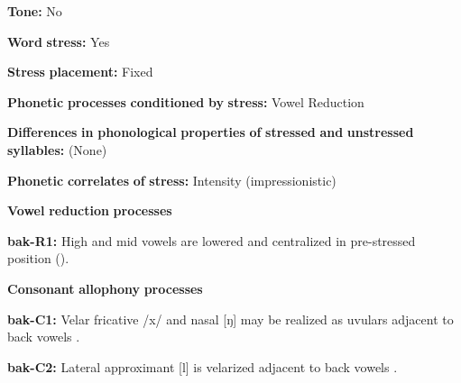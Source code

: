 \begin{styleBody}
\textbf{Tone:} No
\end{styleBody}

\begin{styleBody}
\textbf{Word} \textbf{stress:} Yes
\end{styleBody}

\begin{styleBody}
\textbf{Stress} \textbf{placement:} Fixed
\end{styleBody}

\begin{styleBody}
\textbf{Phonetic} \textbf{processes} \textbf{conditioned} \textbf{by} \textbf{stress:} Vowel Reduction
\end{styleBody}

\begin{styleBody}
\textbf{Differences} \textbf{in} \textbf{phonological} \textbf{properties} \textbf{of} \textbf{stressed} \textbf{and} \textbf{unstressed} \textbf{syllables:} (None)
\end{styleBody}

\begin{styleBody}
\textbf{Phonetic} \textbf{correlates} \textbf{of} \textbf{stress:} Intensity (impressionistic)
\end{styleBody}

\begin{styleBody}
\textbf{Vowel} \textbf{reduction} \textbf{processes}
\end{styleBody}

\begin{styleBody}
\textbf{bak-R1:} High and mid vowels are lowered and centralized in pre-stressed position (\citealt{CarterRobbins2015}).
\end{styleBody}

\begin{styleBody}
\textbf{Consonant} \textbf{allophony} \textbf{processes}
\end{styleBody}

\begin{styleBody}
\textbf{bak-C1:} Velar fricative /x/ and nasal [ŋ] may be realized as uvulars adjacent to back vowels \citep[11]{Poppe1964}.
\end{styleBody}

\begin{styleBody}
\textbf{bak-C2:} Lateral approximant [l] is velarized adjacent to back vowels \citep[10]{Poppe1964}.
\end{styleBody}

